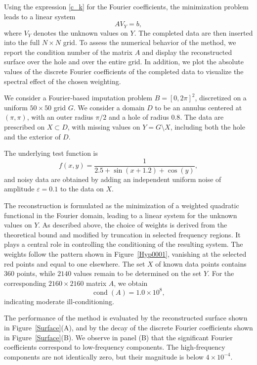 \documentclass[11pt,oneside,reqno]{amsart}
\theoremstyle{plain}
\numberwithin{equation}{section}
\begin{document}
Using the expression \eqref{c_k}  
for the Fourier coefficients,  
the minimization problem  
leads to a linear system  
\[
A V_Y = b,
\]
where $V_Y$ denotes  
the unknown values on $Y$.  
The completed data  
are then inserted  
into the full  
$N\times N$ grid.
To assess the numerical behavior 
of the method,  
we report the condition number  
of the matrix $A$ 
and display the reconstructed surface  
over the hole and over the entire grid.  
In addition, we plot  
the absolute values  
of the discrete Fourier coefficients  
of the completed data 
to visualize  
the spectral effect  
of the chosen weighting. 

We consider a Fourier-based imputation problem $B=[0,2\pi]^2$,  
discretized on a uniform $50\times 50$ grid $G$. 
We consider a domain $D$ to be an annulus centered at $(\pi,\pi)$, with an outer radius $\pi/2$ and a hole of radius $0.8$. 
The data are prescribed on $X \subset D$,  
with missing values on $Y = G \setminus X$,  
including both the hole and the exterior of $D$.

The underlying test function is
\[
f(x,y)=\frac{1}{2.5+\sin(x+1.2)+\cos(y)},
\]
and noisy data are obtained  
by adding an independent uniform noise 
of amplitude $\varepsilon=0.1$  
to the data on $X$.

The reconstruction is formulated  
as the minimization of a weighted quadratic functional  
in the Fourier domain,  
leading to a linear system for the unknown values on $Y$. As described above, the choice of weights is derived from the theoretical bound  
and modified by truncation in selected frequency regions. It 
plays a central role in controlling the conditioning  
of the resulting system. The weights follow  
the pattern shown in Figure~\ref{Hyp0001},  
vanishing at the selected red points  
and equal to one elsewhere. The set $X$ of known data points  
contains $360$ points,  
while $2140$ values  
remain to be determined on the set $Y$. For the corresponding $2160\times 2160$ matrix $A$,  
we obtain  
\[
\operatorname{cond}(A)=1.0\times 10^{8},
\]
indicating moderate ill-conditioning.

The performance of the method  
is evaluated by the reconstructed surface  
shown in Figure~\ref{Surface}(A),  
and by the decay  
of the discrete Fourier coefficients  
shown in Figure~\ref{Surface}(B). We observe in panel (B)  
that the significant Fourier coefficients  
correspond to low-frequency components.  
The high-frequency components  
are not identically zero,  
but their magnitude  
is below $4\times 10^{-4}$.
\end{document}
